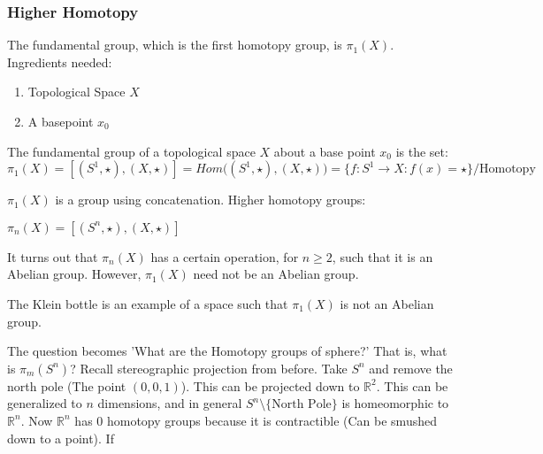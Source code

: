             \subsubsection{Higher Homotopy}
                The fundamental group, which is the first homotopy group,
                is $\pi_{1}(X)$. Ingredients needed:
                \begin{enumerate}
                    \item Topological Space $X$
                    \item A basepoint $x_{0}$
                \end{enumerate}
            \begin{definition}
                The fundamental group of a topological space $X$ about a
                base point $x_{0}$ is the set:
                \begin{equation}
                    \pi_{1}(X)=[(S^{1},\star),(X,\star)]
                              =Hom\big((S^{1},\star),(X,\star)\big)
                              =\{f:S^{1}\rightarrow X:f(x)
                                    =\star\}/\textrm{Homotopy}
                \end{equation}
            \end{definition}
            $\pi_{1}(X)$ is a group using concatenation. Higher homotopy groups:
            \begin{definition}
            $\pi_{n}(X)=[(S^{n},\star),(X,\star)]$
            \end{definition}
            It turns out that $\pi_{n}(X)$ has a certain operation, for
            $n\geq 2$, such that it is an Abelian group. However, $\pi_{1}(X)$
            need not be an Abelian group.
            \begin{example}
                The Klein bottle is an example of a space such that $\pi_{1}(X)$
                is not an Abelian group.
            \end{example}
            The question becomes 'What are the Homotopy groups of sphere?' That
            is, what is $\pi_{m}(S^{n})$? Recall stereographic projection from
            before. Take $S^{n}$ and remove the north pole (The point
            $(0,0,1)$). This can be projected down to $\mathbb{R}^{2}$. This can
            be generalized to $n$ dimensions, and in general
            $S^{n}\setminus\{\textrm{North Pole}\}$ is homeomorphic to
            $\mathbb{R}^{n}$. Now $\mathbb{R}^{n}$ has $0$ homotopy groups
            because it is contractible (Can be smushed down to a point). If
